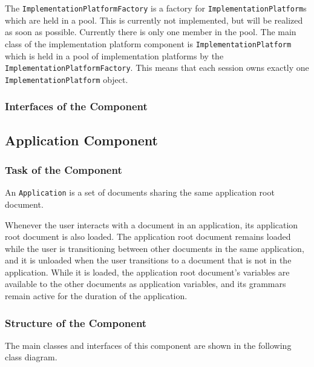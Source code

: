 \documentclass[11pt,a4paper]{article}
\begin{document}
The \texttt{ImplementationPlatformFactory} is a factory for
\texttt{Implementation\-Platform}s which are held in a pool.
This is currently not implemented, but will be realized as soon as possible.
Currently there is only one member in the pool.
The main class of the implementation platform component is 
\texttt{Implemen\-tat\-ion\-Plat\-form} which is held in a pool of 
implementation
platforms by the \texttt{Implementat\-ionPlat\-form\-Factory}. This means
that each session owns exactly one \texttt{Implemen\-tat\-ionPlat\-form}
object.

\subsubsection{Interfaces of the Component}

\subsection{Application Component}

\subsubsection{Task of the Component}

An \texttt{Application} is a set of documents sharing the same 
application root document.

Whenever the user interacts with a document in an application, its
application root document is also loaded. The application root document
remains loaded while the user is transitioning between other documents in the
same application, and it is unloaded when the user transitions to a document
that is not in the application. While it is loaded, the application root
document's variables are available to the other documents as application
variables, and its grammars remain active for the duration of the
application.

\subsubsection{Structure of the Component}

The main classes and interfaces of this component are shown in the following
class diagram.
\end{document}
